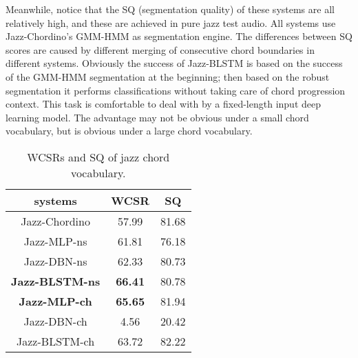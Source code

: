 Meanwhile, notice that the SQ (segmentation quality) of these systems are all relatively high, and these are achieved in pure jazz test audio. All systems use Jazz-Chordino's GMM-HMM as segmentation engine. The differences between SQ scores are caused by different merging of consecutive chord boundaries in different systems. Obviously the success of Jazz-BLSTM is based on the success of the GMM-HMM segmentation at the beginning; then based on the robust segmentation it performs classifications without taking care of chord progression context. This task is comfortable to deal with by a fixed-length input deep learning model. The advantage may not be obvious under a small chord vocabulary, but is obvious under a large chord vocabulary.

\begin{table}[t]
\centering
\footnotesize
\begin{tabular}{|c|c|c|} \hline
systems & WCSR & SQ\\ \hline
Jazz-Chordino & 57.99 & 81.68\\ \hline
Jazz-MLP-ns & 61.81& 76.18\\ \hline
Jazz-DBN-ns & 62.33& 80.73\\ \hline
\textbf{Jazz-BLSTM-ns} & \textbf{66.41} & 80.78\\ \hline
\textbf{Jazz-MLP-ch} & \textbf{65.65} & 81.94\\ \hline
Jazz-DBN-ch & 4.56& 20.42\\ \hline
Jazz-BLSTM-ch & 63.72 & 82.22\\ \hline
\end{tabular}
\caption{WCSRs and SQ of jazz chord vocabulary.}
\label{tab:5-jazz-wcsr}
\end{table}


